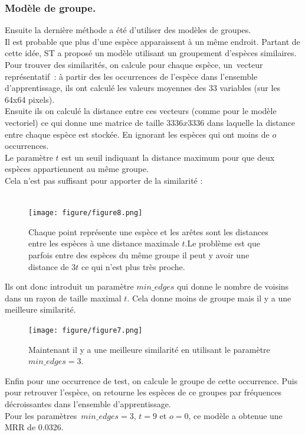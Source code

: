 \documentclass{article}
\begin{document}
\subsubsection{Modèle de groupe.}
Ensuite la dernière méthode a été d'utiliser des modèles de groupes.\\
Il est probable que plus d’une espèce apparaissent à un même endroit. Partant de cette idée, ST a proposé un modèle utilisant un groupement d’espèces similaires.\\Pour trouver des similarités, on calcule pour chaque espèce, un vecteur représentatif : à partir des les occurrences de l’espèce dans l’ensemble d’apprentissage, ils ont calculé les valeurs moyennes des 33 variables (sur les 64x64 pixels).\\
Ensuite ils on calculé la distance entre ces vecteurs (comme pour le modèle vectoriel) ce qui donne une matrice de taille $3336x3336$ dans laquelle la distance entre chaque espèce est stockée. En ignorant les espèces qui ont moins de $o$ occurrences.\\
Le paramètre $t$ est un seuil indiquant la distance maximum pour que deux espèces appartiennent au même groupe.\\
Cela n’est pas suffisant pour apporter de la similarité :\\\\
\begin{figure}[H]
	\center
	\texttt{[image: figure/figure8.png]} 
	 \caption{Chaque point représente une espèce et les arêtes sont les distances entre les espèces à une distance maximale $t$.Le problème est que parfois entre des espèces du même groupe il peut y avoir une distance de $3t$ ce qui n'est plus très proche. }
\end{figure}
Ils ont donc introduit un paramètre $min\_edges$ qui donne le nombre de voisins dans un rayon de taille maximal $t$. Cela donne moins de groupe mais il y a une meilleure similarité.\\
\begin{figure}[H]
	\center
	\texttt{[image: figure/figure7.png]} 
	 \caption{Maintenant il y a une meilleure similarité en utilisant le paramètre $min\_edges = 3 $. }
\end{figure}
Enfin pour une occurrence de test, on calcule le groupe de cette occurrence. Puis pour retrouver l’espèce, on retourne les espèces de ce groupes par fréquences décroissantes dans l’ensemble d’apprentissage.\\Pour les paramètres $min\_edges = 3$, $t = 9 $ et $o = 0$, ce modèle a obtenue une MRR de 0.0326.
\end{document}
